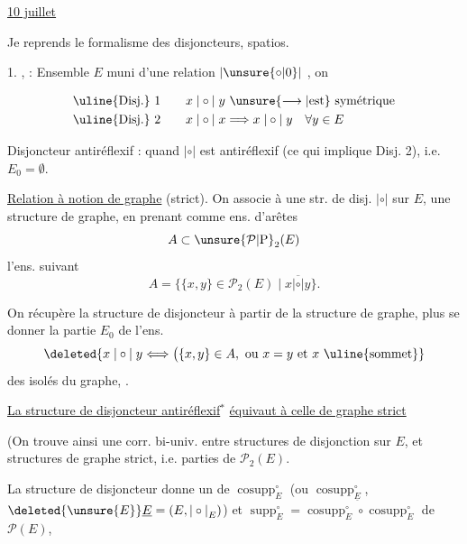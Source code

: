 \uline{10 juillet}

Je reprends  le formalisme des disjoncteurs, spatios.

1. \uline{},  : Ensemble $E$ muni d'une relation $\mathrel{|\unsure{\circ|0}|}$ , on  

\[
\begin{aligned}
&\text{\uline{Disj.} 1}\qquad x\mathrel{|\circ|}y\ \unsure{\longrightarrow|\text{est}}\ \text{symétrique}\\
&\text{\uline{Disj.} 2}\qquad x\mathrel{|\circ|}x\Longrightarrow x\mathrel{|\circ|}y\quad\forall y\in E
\end{aligned}
\]

 
Disjoncteur antiréflexif : quand $\mathrel{|\circ|}$ est antiréflexif (ce qui implique Disj. 2), i.e. $E_{0}=\emptyset$.

\uline{Relation à notion de graphe} (strict). On associe à une str. de disj. $\mathrel{|\circ|}$ sur $E$, une structure de graphe, en prenant comme ens. d'arêtes
\[
A\subset\unsure{\mathcal{P}|\mathrm{P}}_{2}(E)
\]
l'ens. suivant
\[
A=\bigl\{\{x,y\}\in\mathcal{P}_{2}(E)\mid x\mathrel{\overline{|\circ|}}y\bigr\}.
\]

On récupère  la structure de disjoncteur à partir de la structure de graphe,   plus se donner la partie $E_{0}$ de l'ens.
\[
\deleted{x\mathrel{|\circ|}y\Longleftrightarrow\bigl(\{x,y\}\in A,\ \text{ou }x=y\text{ et }x\ \text{\uline{sommet}}}
\]
des   isolés du graphe, .

\uline{La structure de disjoncteur antiréflexif}$^{\ast}$ \uline{équivaut à celle de graphe strict}

(On trouve ainsi une corr. bi-univ. entre structures de disjonction sur $E$, et structures de graphe strict, i.e. parties de $\mathcal{P}_{2}(E)$.

La structure de disjoncteur donne un  de  $\operatorname{cosupp}_{E}^{\circ}$ (ou $\operatorname{cosupp}_{\underline{E}}^{\circ}$,  $\deleted{\unsure{E}}\underline{E}=(E,\mathrel{|\circ|}_{E})$) et $\operatorname{supp}_{E}^{\circ}=\operatorname{cosupp}_{E}^{\circ}\circ\operatorname{cosupp}_{E}^{\circ}$  de $\mathcal{P}(E)$, 
